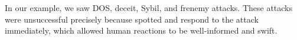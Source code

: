 In our example, we saw DOS, deceit, Sybil, and frenemy attacks.
These attacks were unsuccessful precisely because \projectName spotted and respond to the attack immediately, which allowed human reactions to be well-informed and swift.